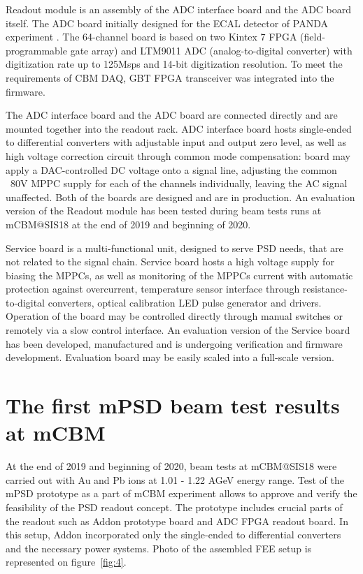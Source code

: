 \documentclass{CBM-PR-2020}
\begin{document}
Readout module is an assembly of the ADC interface board and the ADC board itself. The ADC board initially designed for the ECAL detector of PANDA experiment \cite {2}. The 64-channel board is based on two Kintex 7 FPGA (field-programmable gate array) and LTM9011 ADC (analog-to-digital converter) with digitization rate up to 125Msps and 14-bit digitization resolution. To meet the requirements of CBM DAQ, GBT FPGA transceiver was integrated into the firmware. 

The ADC interface board and the ADC board are connected directly and are mounted together into the readout rack.
ADC interface board hosts single-ended to differential converters with adjustable input and output zero level, as well as high voltage correction circuit through common mode compensation: board may apply a DAC-controlled DC voltage onto a signal line, adjusting the common ~80V MPPC supply for each of the channels individually, leaving the AC signal unaffected. Both of the boards are designed and are in production. An evaluation version of the Readout module has been tested during beam tests runs at mCBM@SIS18 at the end of 2019 and beginning of 2020\cite{3}.


Service board is a multi-functional unit, designed to serve PSD needs, that are not related to the signal chain. Service board hosts a high voltage supply for biasing the MPPCs, as well as monitoring of the MPPCs current with automatic protection against overcurrent, temperature sensor interface through resistance-to-digital converters, optical calibration LED pulse generator and drivers. Operation of the board may be controlled directly through manual switches or remotely via a slow control interface.
An evaluation version of the Service board has been developed, manufactured and is undergoing verification and firmware development. Evaluation board may be easily scaled into a full-scale version.


\section{ The first mPSD beam test results at mCBM}
At the end of 2019 and beginning of 2020, beam tests at mCBM@SIS18 were carried out with Au and Pb ions at 1.01 - 1.22 AGeV energy range. Test of the mPSD prototype as a part of mCBM experiment allows to approve and verify the feasibility of the PSD readout concept. The prototype includes crucial parts of the readout such as Addon prototype board and ADC FPGA readout board. In this setup, Addon incorporated only the single-ended to differential converters and the necessary power systems. Photo of the assembled FEE setup is represented on figure~\ref{fig:4}.
\end{document}
